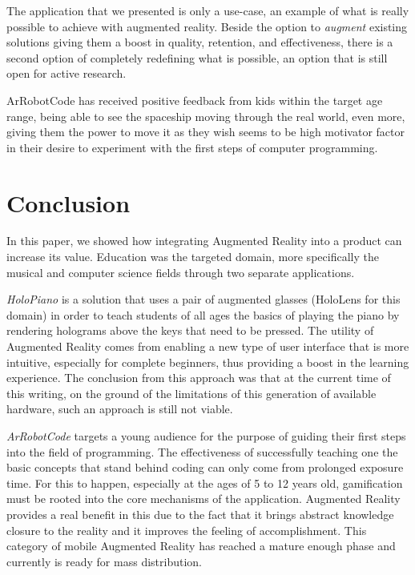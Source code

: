 \documentclass[12 pct]{report}
\begin{document}
The application that we presented is only a use-case, an example of what is really possible to achieve with augmented reality. Beside the option to \textit{augment} existing solutions giving them a boost in quality, retention, and effectiveness, there is a second option of completely redefining what is possible, an option that is still open for active research.

ArRobotCode has received positive feedback from kids within the target age range, being able to see the spaceship moving through the real world, even more, giving them the power to move it as they wish seems to be high motivator factor in their desire to experiment with the first steps of computer programming.


\chapter{Conclusion}
In this paper, we showed how integrating Augmented Reality into a product can increase its value. 
Education was the targeted domain, more specifically the musical and computer science fields through two separate applications.

\textit{HoloPiano} is a solution that uses a pair of augmented glasses (HoloLens for this domain) in order to teach students of all ages the basics of playing the piano by rendering holograms above the keys that need to be pressed. 
The utility of Augmented Reality comes from enabling a new type of user interface that is more intuitive, especially for complete beginners, thus providing a boost in the learning experience. 
The conclusion from this approach was that at the current time of this writing, on the ground of the limitations of this generation of available hardware, such an approach is still not viable. 

\textit{ArRobotCode} targets a young audience for the purpose of guiding their first steps into the field of programming. 
The effectiveness of successfully teaching one the basic concepts that stand behind coding can only come from prolonged exposure time.
For this to happen, especially at the ages of 5 to 12 years old, gamification must be rooted into the core mechanisms of the application. 
Augmented Reality provides a real benefit in this due to the fact that it brings abstract knowledge closure to the reality and it improves the feeling of accomplishment.
This category of mobile Augmented Reality has reached a mature enough phase and currently is ready for mass distribution. 
\end{document}

